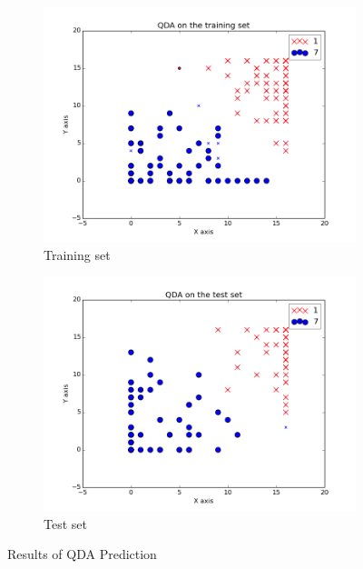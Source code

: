 \documentclass{article}
\begin{document}
\begin{figure}
        \centering
        \begin{subfigure}[b]{0.5\textwidth}
                \includegraphics[width=\textwidth]{../QDAtrainingset.png}
                \caption{Training set}
        \end{subfigure}%
        \begin{subfigure}[b]{0.5\textwidth}
                \includegraphics[width=\textwidth]{../QDAtestset.png}
                \caption{Test set}
        \end{subfigure}
        \caption{Results of QDA Prediction}
        \label{img4}
\end{figure}
\end{document}
